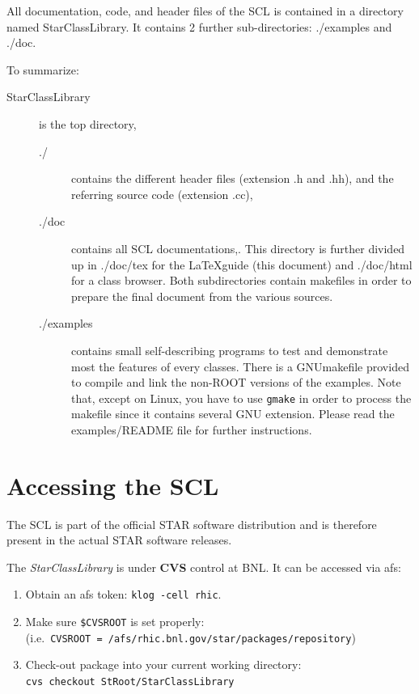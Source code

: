 \documentclass[twoside]{article}
\newcommand{\name}[1]{\textsf{#1}}%
\newcommand{\comp}[1]{\texttt{#1}}%
\begin{document}
All documentation, code, and header files of the SCL is contained in a
directory named \name{StarClassLibrary}.
It contains 2 further sub-directories:
\name{./examples} and \name{./doc}.

To summarize:
\vspace{-11pt}
\begin{description}
\item[\name{StarClassLibrary}] is the top directory,
\begin{description}
\item[\name{./}] contains the different header files
    (extension \name{.h} and \name{.hh}),
and the referring source code (extension \name{.cc}),
\item[\name{./doc}] contains all SCL documentations,. This directory is
    further divided up in \name{./doc/tex} for the \LaTeX guide (this document)
    and \name{./doc/html} for a class browser. Both subdirectories
    contain makefiles in order to prepare the final document from the
    various sources.
\item[\name{./examples}] contains small self-describing programs to test and
    demonstrate most the features of every classes. There is a
    \name{GNUmakefile}
    provided to compile and link the non-ROOT versions of the examples.
    Note that, except on Linux, you have to use \comp{gmake} in order to
    process the makefile since it contains several GNU extension. Please
    read the \name{examples/README} file for further instructions.
\end{description}    
\end{description}

\section{Accessing the SCL}  

The SCL is part of the official STAR software distribution
and is therefore present in the actual STAR software releases.

The {\em StarClassLibrary} is under {\bf CVS} control at BNL.  It can
be accessed via \name{afs}:   
\begin{enumerate}
  \item Obtain an \name{afs} token: \comp{klog -cell rhic}.
  \item Make sure \comp{\$CVSROOT} is set properly:\\
    (i.e.~\comp{CVSROOT = /afs/rhic.bnl.gov/star/packages/repository})
  \item Check-out package into your current working directory:\\
    \comp{cvs checkout StRoot/StarClassLibrary}
\end{enumerate}
\end{document}
